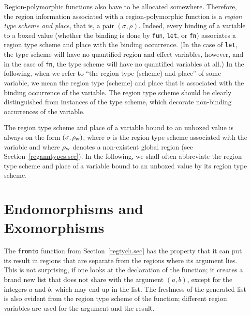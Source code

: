\documentclass[12pt]{book}
\newcommand{\rhoword}{\rho_{\rm w}}
\begin{document}
%
Region-polymorphic functions also have to be allocated somewhere.
Therefore, the region information associated with a region-polymorphic
function is a {\em region type scheme and place}, that is, a pair
$(\sigma,\rho)$.  Indeed, every binding of a variable to a boxed value
(whether the binding is done by {\tt fun}, {\tt let}, or {\tt fn})
associates a region type scheme and place with the binding occurrence.
(In the case of {\tt let}, the type scheme will have no quantified
region and effect variables, however, and in the case of {\tt fn}, the
type scheme will have no quantified variables at all.)  In the
following, when we refer to ``the region type (scheme) and place'' of
some variable, we mean the region type (scheme) and place that is
associated with the binding occurrence of the variable. The region
type scheme should be clearly distinguished from instances of the type
scheme, which decorate non-binding occurrences of the variable.

The region type scheme and place of a variable bound to an unboxed
value is always on the form $(\sigma,\rhoword)$, where $\sigma$ is the
region type scheme associated with the variable and where $\rhoword$ denotes
a non-existent global region (see Section~\ref{reganntypes.sec}). In
the following, we shall often abbreviate the region type scheme and
place of a variable bound to an unboxed value by its region type
scheme.

\section{Endomorphisms and Exomorphisms}
The {\tt fromto} function from Section~\ref{regtych.sec} has the property that
it can put its result in regions that are separate from the regions where its
argument lies. This is not surprising, if one looks at the declaration of the
function; it creates a brand new list that does not share with the argument
$(a,b)$, except for the integers $a$ and $b$, which may end up in the list.
The freshness of the generated list is also evident from the region type scheme
of the function; different region variables are used for the argument and the result.
\end{document}
